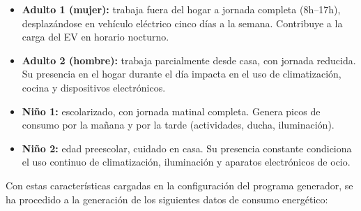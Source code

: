 \begin{itemize}
    \item \textbf{Adulto 1 (mujer):} trabaja fuera del hogar a jornada completa (8h–17h),
    desplazándose en vehículo eléctrico cinco días a la semana. Contribuye a la carga del
    EV en horario nocturno.

    \item \textbf{Adulto 2 (hombre):} trabaja parcialmente desde casa, con jornada reducida.
    Su presencia en el hogar durante el día impacta en el uso de climatización, cocina y
    dispositivos electrónicos.

    \item \textbf{Niño 1:} escolarizado, con jornada matinal completa. Genera picos de consumo
    por la mañana y por la tarde (actividades, ducha, iluminación).

    \item \textbf{Niño 2:} edad preescolar, cuidado en casa. Su presencia constante condiciona
    el uso continuo de climatización, iluminación y aparatos electrónicos de ocio.
\end{itemize}
Con estas características cargadas en la configuración del programa generador, se ha procedido a la
generación de los siguientes datos de consumo energético:

